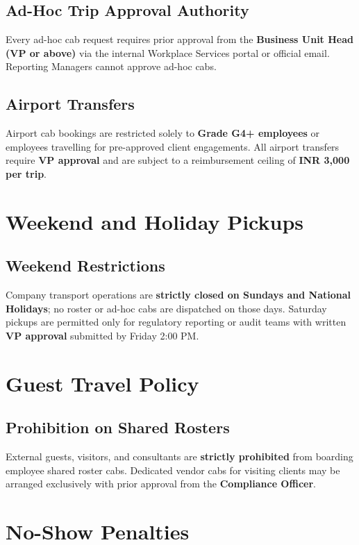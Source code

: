 \documentclass[11pt,a4paper]{article}
\begin{document}
\subsection{Ad-Hoc Trip Approval Authority}
Every ad-hoc cab request requires prior approval from the \textbf{Business Unit Head (VP or above)} via the internal Workplace Services portal or official email. Reporting Managers cannot approve ad-hoc cabs.

\subsection{Airport Transfers}
Airport cab bookings are restricted solely to \textbf{Grade G4+ employees} or employees travelling for pre-approved client engagements. All airport transfers require \textbf{VP approval} and are subject to a reimbursement ceiling of \textbf{INR 3,000 per trip}.

\section{Weekend and Holiday Pickups}
\subsection{Weekend Restrictions}
Company transport operations are \textbf{strictly closed on Sundays and National Holidays}; no roster or ad-hoc cabs are dispatched on those days. Saturday pickups are permitted only for regulatory reporting or audit teams with written \textbf{VP approval} submitted by Friday 2:00 PM.

\section{Guest Travel Policy}
\subsection{Prohibition on Shared Rosters}
External guests, visitors, and consultants are \textbf{strictly prohibited} from boarding employee shared roster cabs. Dedicated vendor cabs for visiting clients may be arranged exclusively with prior approval from the \textbf{Compliance Officer}.

\section{No-Show Penalties}
\end{document}

